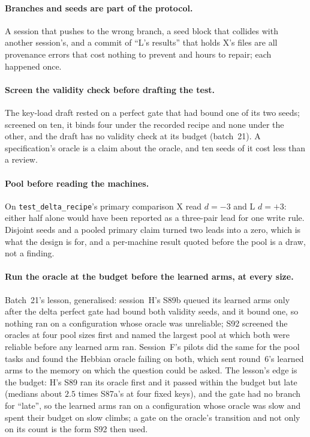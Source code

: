 \documentclass[11pt]{article}
\begin{document}
\paragraph{Branches and seeds are part of the protocol.} A session that pushes to the wrong branch, a seed block that collides with another session's, and a commit of ``L's results'' that holds X's files are all provenance errors that cost nothing to prevent and hours to repair; each happened once.

\paragraph{Screen the validity check before drafting the test.} The key-load draft rested on a perfect gate that had bound one of its two seeds; screened on ten, it binds four under the recorded recipe and none under the other, and the draft has no validity check at its budget (batch~21). A specification's oracle is a claim about the oracle, and ten seeds of it cost less than a review.

\paragraph{Pool before reading the machines.} On \texttt{test\_delta\_recipe}'s primary comparison X read $d = -3$ and L $d = +3$: either half alone would have been reported as a three-pair lead for one write rule. Disjoint seeds and a pooled primary claim turned two leads into a zero, which is what the design is for, and a per-machine result quoted before the pool is a draw, not a finding.

\paragraph{Run the oracle at the budget before the learned arms, at every size.} Batch~21's lesson, generalised: session~H's S89b queued its learned arms only after the delta perfect gate had bound both validity seeds, and it bound one, so nothing ran on a configuration whose oracle was unreliable; S92 screened the oracles at four pool sizes first and named the largest pool at which both were reliable before any learned arm ran. Session~F's pilots did the same for the pool tasks and found the Hebbian oracle failing on both, which sent round~6's learned arms to the memory on which the question could be asked. The lesson's edge is the budget: H's S89 ran its oracle first and it passed within the budget but late (medians about $2.5$ times S87a's at four fixed keys), and the gate had no branch for ``late'', so the learned arms ran on a configuration whose oracle was slow and spent their budget on slow climbs; a gate on the oracle's transition and not only on its count is the form S92 then used.
\end{document}

